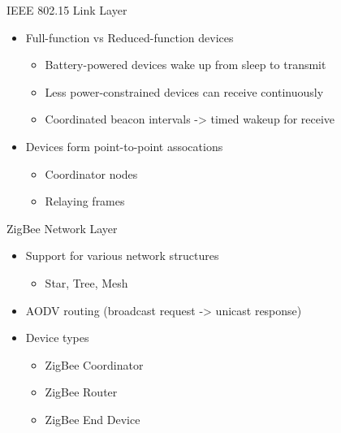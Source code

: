 \documentclass{beamer}
\begin{document}
\begin{frame}{IEEE 802.15 Link Layer}
  \begin{itemize}
    \item Full-function vs Reduced-function devices
	\begin{itemize}
  		\item Battery-powered devices wake up from sleep to transmit
  		\item Less power-constrained devices can receive continuously
  		\item Coordinated beacon intervals -> timed wakeup for receive
	\end{itemize}
	
  	\item Devices form point-to-point assocations
  	\begin{itemize}
  		\item Coordinator nodes
  		\item Relaying frames
  	\end{itemize}
  \end{itemize}
\end{frame}

\begin{frame}{ZigBee Network Layer}
  \begin{itemize}
  	\item Support for various network structures
  	\begin{itemize}
  		\item Star, Tree, Mesh
  	\end{itemize}
  	\item AODV routing (broadcast request -> unicast response)
  	\item Device types
  	\begin{itemize}
  		\item ZigBee Coordinator
  		\item ZigBee Router
  		\item ZigBee End Device
  	\end{itemize}
  \end{itemize}
\end{frame}
\end{document}

